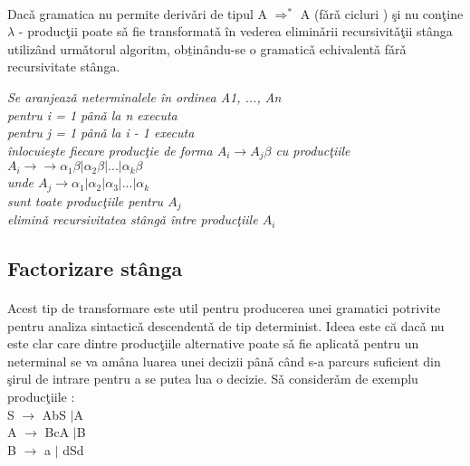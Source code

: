 \paragraph*{}
Dac\v a gramatica nu permite deriv\v ari de tipul A $\Rightarrow ^{*}$ A (f\v ar\v a cicluri ) \c si nu con\c tine $\lambda$ - produc\c tii poate s\v a fie transformat\v a \^ in vederea elimin\v arii recursivit\v a\c tii st\^ anga utiliz\^ and urm\v atorul algoritm, ob\b tin\^ andu-se o gramatic\v a echivalent\v a f\v ar\v a recursivitate st\^ anga. 

\textit{
Se aranjeaz\v a neterminalele \^ in ordinea A1, ..., An\\
pentru i = 1 p\^ an\v a la n  executa \\
pentru j = 1 p\^ an\v a la i - 1 executa \\ 
\^inlocuie\c ste fiecare produc\c tie de forma $A_{i} \rightarrow A_{j} \beta$ cu produc\c tiile \\ $A_{i} \rightarrow → \alpha_{1}\beta | \alpha_{2}\beta|...|\alpha_{k}\beta  $ \\
unde $A_{j}\rightarrow \alpha_{1}|\alpha_{2}|\alpha_{3}|...|\alpha_{k}$\\
sunt toate produc\c tiile pentru $A_{j}$
\\
elimin\v a recursivitatea st\^ ang\v a \^ intre produc\c tiile $A_{i}$
}




\subsection{Factorizare st\^ anga}
\paragraph*{}
 Acest tip de transformare este util pentru producerea unei gramatici potrivite pentru analiza sintactic\v a 
descendent\v a de tip determinist. Ideea este că dac\v a nu este clar care dintre produc\c tiile alternative poate s\v a fie aplicat\v a pentru un neterminal se va am\^ ana luarea unei decizii p\^ an\v a c\^ and s-a parcurs suficient din \c sirul
de intrare pentru a se putea lua o decizie. S\v a consider\v am de exemplu produc\c tiile : \\
S $\rightarrow$ AbS $|$A \\
A $\rightarrow$ BcA $|$B \\
B $\rightarrow$ a $|$ dSd 
\paragraph*{}

